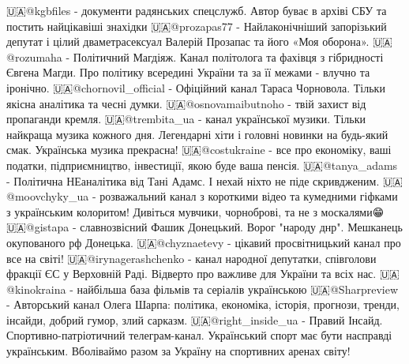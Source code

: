 🇺🇦@kgbfiles - документи радянських спецслужб. Автор буває в архіві СБУ та постить найцікавіші знахідки
🇺🇦@prozapas77 - Найлаконічніший запорізький депутат і цілий дваметрасексуал Валерій Прозапас та його «Моя оборона».
🇺🇦@rozumaha - Політичний Магдіяж. Канал політолога та фахівця з гібридності Євгена Магди. Про політику всередині України та за її межами - влучно та іронічно.
🇺🇦@chornovil_official - Офіційний канал Тараса Чорновола. Тільки якісна аналітика та чесні думки.
🇺🇦@osnovamaibutnoho - твій захист від пропаганди кремля.
🇺🇦@trembita_ua - канал української музики. Тільки найкраща музика кожного дня. Легендарні хіти і головні новинки на будь-який смак. Українська музика прекрасна!
🇺🇦@costukraine - все про економіку, ваші податки, підприємництво, інвестиції, якою буде ваша пенсія.
🇺🇦@tanya_adams - Політична НЕаналітика від Тані Адамс. І нехай ніхто не піде скривдженим.
🇺🇦@moovchyky_ua - розважальний канал з короткими відео та кумедними гіфками з українським колоритом! Дивіться мувчики, чорноброві, та не з москалями😁
🇺🇦@gistapa - славнозвісний Фашик Донецький. Ворог "народу днр". Мешканець окупованого рф Донецька.
🇺🇦@chyznaetevy - цікавий просвітницький канал про все на світі!
🇺🇦@irynagerashchenko - канал народної депутатки, співголови фракції ЄС у Верховній Раді. Відверто про важливе для України та всіх нас.
🇺🇦@kinokraina - найбільша база фільмів та серіалів українською
🇺🇦@Sharpreview - Авторський канал Олега Шарпа: політика, економіка, історія, прогнози, тренди, інсайди, добрий гумор, злий сарказм.
🇺🇦@right_inside_ua - Правий Інсайд. Спортивно-патріотичний телеграм-канал. Український спорт має бути насправді українським. Вболіваймо разом за Україну на спортивних аренах світу!

